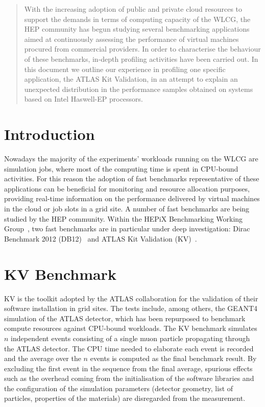 \begin{abstract}
With the increasing adoption of public and private cloud resources to support
the demands in terms of computing capacity of the WLCG, the HEP community has begun
studying several benchmarking applications aimed at continuously assessing the
performance of virtual machines procured from commercial providers.
In order to characterise the behaviour of these benchmarks, in-depth
profiling activities have been carried out. In this document we outline
our experience in profiling one specific application, the ATLAS Kit Validation,
in an attempt to explain an unexpected distribution in the performance samples
obtained on systems based on Intel Haswell-EP processors.
\end{abstract}


\section{Introduction}
Nowadays the majority of the experiments' workloads running on the WLCG are simulation 
jobs, where most of the computing time is spent in CPU-bound activities. For this 
reason the adoption of fast benchmarks representative of these applications
can be beneficial for monitoring and resource allocation purposes,
providing real-time information on the performance delivered by virtual 
machines in the cloud or job slots in a grid site.
A number of fast benchmarks are being studied by the HEP community. Within the 
HEPiX Benchmarking Working Group~\cite{HEPiX:2014:HEPiX}, two fast benchmarks are 
in particular under deep investigation: Dirac Benchmark 2012 (DB12)~\cite{CERN:2016:DB12} 
and ATLAS Kit Validation (KV)~\cite{KV}.

\section{KV Benchmark}
KV is the toolkit adopted by the ATLAS collaboration for the
validation of their software installation in grid sites. The tests include, among
others, the GEANT4~\cite{GEANT4} simulation of the ATLAS detector, which
has been repurposed to benchmark compute resources against CPU-bound 
workloads. The KV benchmark simulates $n$ independent events consisting of a single muon particle 
propagating through the ATLAS detector. The CPU time needed to elaborate each event 
is recorded and the average over the $n$ events is computed as the final benchmark result.
By excluding the first event in the sequence from the final average, spurious effects such as the 
overhead coming from the initialisation of the software libraries and the configuration 
of the simulation parameters (detector geometry, list of particles, properties of 
the materials) are disregarded from the measurement.

